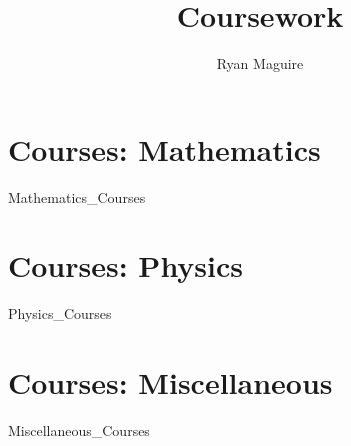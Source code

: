 \documentclass[crop=false,class=book,oneside]{standalone}
\begin{document}
    \newif\ifcourses
    \ifstandalone
        \title{Coursework}
        \author{Ryan Maguire}
        \date{\vspace{-5ex}}
        \maketitle
        \tableofcontents
        \listoffigures
        \listoftables
        \clearpage
    \fi
    \part{Courses: Mathematics}
        {Mathematics_Courses}
    \part{Courses: Physics}
        {Physics_Courses}
    \part{Courses: Miscellaneous}
        {Miscellaneous_Courses}
\end{document}
